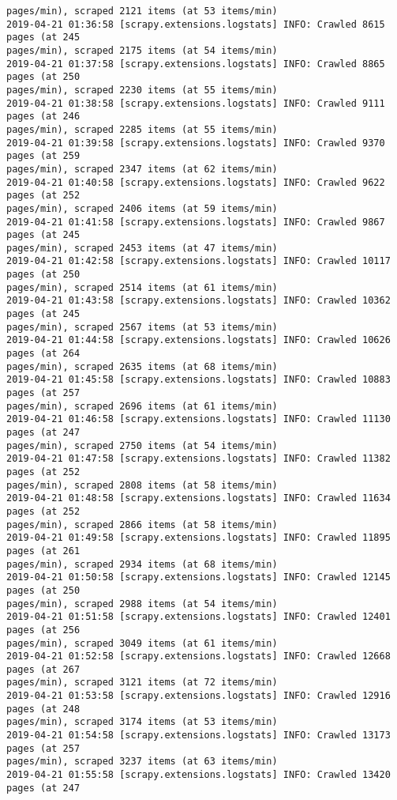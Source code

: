 \documentclass[11pt]{article}
\begin{document}
\begin{Verbatim}[commandchars=\\\{\},fontsize=\footnotesize]
pages/min), scraped 2121 items (at 53 items/min)
2019-04-21 01:36:58 [scrapy.extensions.logstats] INFO: Crawled 8615 pages (at 245
pages/min), scraped 2175 items (at 54 items/min)
2019-04-21 01:37:58 [scrapy.extensions.logstats] INFO: Crawled 8865 pages (at 250
pages/min), scraped 2230 items (at 55 items/min)
2019-04-21 01:38:58 [scrapy.extensions.logstats] INFO: Crawled 9111 pages (at 246
pages/min), scraped 2285 items (at 55 items/min)
2019-04-21 01:39:58 [scrapy.extensions.logstats] INFO: Crawled 9370 pages (at 259
pages/min), scraped 2347 items (at 62 items/min)
2019-04-21 01:40:58 [scrapy.extensions.logstats] INFO: Crawled 9622 pages (at 252
pages/min), scraped 2406 items (at 59 items/min)
2019-04-21 01:41:58 [scrapy.extensions.logstats] INFO: Crawled 9867 pages (at 245
pages/min), scraped 2453 items (at 47 items/min)
2019-04-21 01:42:58 [scrapy.extensions.logstats] INFO: Crawled 10117 pages (at 250
pages/min), scraped 2514 items (at 61 items/min)
2019-04-21 01:43:58 [scrapy.extensions.logstats] INFO: Crawled 10362 pages (at 245
pages/min), scraped 2567 items (at 53 items/min)
2019-04-21 01:44:58 [scrapy.extensions.logstats] INFO: Crawled 10626 pages (at 264
pages/min), scraped 2635 items (at 68 items/min)
2019-04-21 01:45:58 [scrapy.extensions.logstats] INFO: Crawled 10883 pages (at 257
pages/min), scraped 2696 items (at 61 items/min)
2019-04-21 01:46:58 [scrapy.extensions.logstats] INFO: Crawled 11130 pages (at 247
pages/min), scraped 2750 items (at 54 items/min)
2019-04-21 01:47:58 [scrapy.extensions.logstats] INFO: Crawled 11382 pages (at 252
pages/min), scraped 2808 items (at 58 items/min)
2019-04-21 01:48:58 [scrapy.extensions.logstats] INFO: Crawled 11634 pages (at 252
pages/min), scraped 2866 items (at 58 items/min)
2019-04-21 01:49:58 [scrapy.extensions.logstats] INFO: Crawled 11895 pages (at 261
pages/min), scraped 2934 items (at 68 items/min)
2019-04-21 01:50:58 [scrapy.extensions.logstats] INFO: Crawled 12145 pages (at 250
pages/min), scraped 2988 items (at 54 items/min)
2019-04-21 01:51:58 [scrapy.extensions.logstats] INFO: Crawled 12401 pages (at 256
pages/min), scraped 3049 items (at 61 items/min)
2019-04-21 01:52:58 [scrapy.extensions.logstats] INFO: Crawled 12668 pages (at 267
pages/min), scraped 3121 items (at 72 items/min)
2019-04-21 01:53:58 [scrapy.extensions.logstats] INFO: Crawled 12916 pages (at 248
pages/min), scraped 3174 items (at 53 items/min)
2019-04-21 01:54:58 [scrapy.extensions.logstats] INFO: Crawled 13173 pages (at 257
pages/min), scraped 3237 items (at 63 items/min)
2019-04-21 01:55:58 [scrapy.extensions.logstats] INFO: Crawled 13420 pages (at 247

\end{Verbatim}
\end{document}

